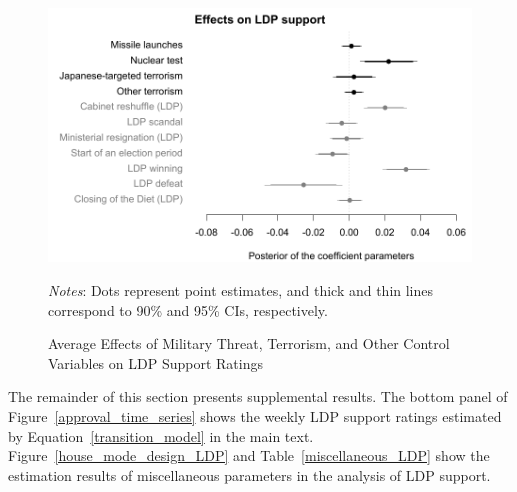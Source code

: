 \documentclass[12pt,letterpaper]{scrartcl}
\begin{document}
\begin{figure}[!ht]
\begin{minipage}{\hsize}
\centering
\singlespacing
\includegraphics[scale=1]{Figure_POQ/average_effect_on_LDP_support.pdf}
\caption{Average Effects of Military Threat, Terrorism, and Other Control Variables on LDP Support Ratings}
\label{average_effect_on_LDP_support}
\end{minipage}
\begin{minipage}{\hsize}
\singlespacing
\small
\emph{Notes}: Dots represent point estimates, and thick and thin lines correspond to 90\% and 95\% CIs, respectively.
\end{minipage}
\end{figure}

The remainder of this section presents supplemental results. The bottom panel of Figure~\ref{approval_time_series} shows the weekly LDP support ratings estimated by Equation~\eqref{transition_model} in the main text. Figure~\ref{house_mode_design_LDP} and Table~\ref{miscellaneous_LDP} show the estimation results of miscellaneous parameters in the analysis of LDP support.
\end{document}
